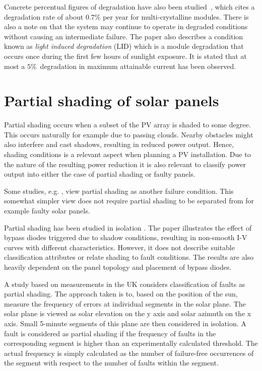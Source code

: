 Concrete percentual figures of degradation have also been studied~\cite{Quintana2002}, which cites a degradation rate of about $0.7\%$ per year for multi-crystalline modules.
There is also a note on that the system may continue to operate in degraded conditions without causing an intermediate failure.
The paper also describes a condition known as \emph{light induced degradation} (LID) which is a module degradation
that occurs once during the first few hours of sunlight exposure.
It is stated that at most a $5\%$ degradation in maximum attainable current has been observed.

\section{Partial shading of solar panels}
Partial shading occurs when a subset of the PV array is shaded to some degree.
This occurs naturally for example due to passing clouds.
Nearby obstacles might also interfere and cast shadows, resulting in reduced power output.
Hence, shading conditions is a relevant aspect when planning a PV installation.
Due to the nature of the resulting power reduction it is also relevant to classify power output into either the case of partial shading or faulty panels.

Some studies, e.g. \cite{Stettler2005}, view partial shading as another failure condition.
This somewhat simpler view does not require partial shading to be separated from for example faulty solar panels.

Partial shading has been studied in isolation \cite{Alsayid2013}.
The paper illustrates the effect of bypass diodes triggered due to shadow conditions, resulting in non-smooth I-V curves with different characteristics.
However, it does not describe suitable classification attributes or relate shading to fault conditions.
The results are also heavily dependent on the panel topology and placement of bypass diodes.

A study based on measurements in the UK \cite{Firth2010} considers classification of faults as partial shading.
The approach taken is to, based on the position of the sun, measure the frequency of errors at individual segments in the solar plane.
The solar plane is viewed as solar elevation on the y axis and solar azimuth on the x axis.
Small 5-minute segments of this plane are then considered in isolation.
A fault is considered as partial shading if the frequency of faults in the corresponding segment is higher than an experimentally calculated threshold.
The actual frequency is simply calculated as the number of failure-free occurrences of the segment with respect to the number of faults within the segment.

